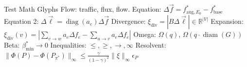 \documentclass[aspectratio=169, 10pt]{beamer}
\begin{document}
\begin{frame}{Test Math Glyphs}
Flow: traffic, flux, flow.
Equation: $\Delta \vec{f} = f_{\text{aug}, E_0}^* - f_{\text{base}}^*$
Equation 2: $\Delta \vec{\ell} = \operatorname{diag}(a_e) \Delta \vec{f}$
Divergence: $\xi_{\text{div}} = |B \Delta \vec{\ell}| \in \mathbb{R}^{|V|}$
Expansion: $\xi_{\text{div}}(v) = \left| \sum_{v \to w} a_e \Delta f_e - \sum_{u \to v} a_e \Delta f_e \right|$
Omega: $\Omega(q)$, $\Omega(q \cdot \operatorname{diam}(G))$
Beta: $\beta_{\min}^* \to 0$
Inequalities: $\le, \ge, \to, \infty$
Resolvent: $\|\Phi(P) - \Phi(P_{\pi^*})\|_\infty \le \frac{\gamma}{(1-\gamma)^2} \|\xi\|_\infty \epsilon_P$
\end{frame}
\end{document}
